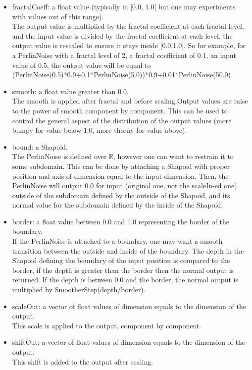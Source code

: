 \begin{itemize}
\item fractalCoeff: a float value (typically in ]0.0, 1.0[ but one may experiments with values out of this range).\\
The output value is multiplied by the fractal coefficient at each fractal level, and the input value is divided by the fractal coefficient at each level. the output value is rescaled to ensure it stays inside [0.0,1.0]. So for example, for a PerlinNoise with a fractal level of 2, a fractal coefficient of 0.1, an input value of 0.5, the output value will be equal to (PerlinNoise(0.5)*0.9+0.1*PerlinNoise(5.0))*0.9+0.01*PerlinNoise(50.0)
\item smooth: a float value greater than 0.0.\\
The smooth is applied after fractal and before scaling.Output values are raise to the power of smooth component by component. This can be used to control the general aspect of the distribution of the output values (more bumpy for value below 1.0, more thorny for value above).
\item bound: a Shapoid.\\
The PerlinNoise is defined over $\mathbb{R}$, however one can want to restrain it to some subdomain. This can be done by attaching a Shapoid with proper position and axis of dimension equal to the input dimension. Then, the PerlinNoise will output 0.0 for input (original one, not the scaleIn-ed one) outside of the subdomain defined by the outside of the Shapoid, and its normal value for the subdomain defined by the inside of the Shapoid.
\item border: a float value between 0.0 and 1.0 representing the border of the boundary.\\
If the PerlinNoise is attached to a boundary, one may want a smooth transition between the outside and inside of the boundary. The depth in the Shapoid defining the boundary of the input position is compared to the border, if the depth is greater than the border then the normal output is returned. If the depth is between 0.0 and the border, the normal output is multiplied by SmootherStep(depth/border).
\item scaleOut: a vector of float values of dimension equals to the dimension of the output.\\
This scale is applied to the output, component by component.
\item shiftOut: a vector of float values of dimension equals to the dimension of the output.\\
This shift is added to the output after scaling.
\end{itemize}

